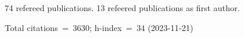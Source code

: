74 refereed publications. 13 refeered publications as first author.

Total citations~=~3630; h-index~=~34 (2023-11-21)